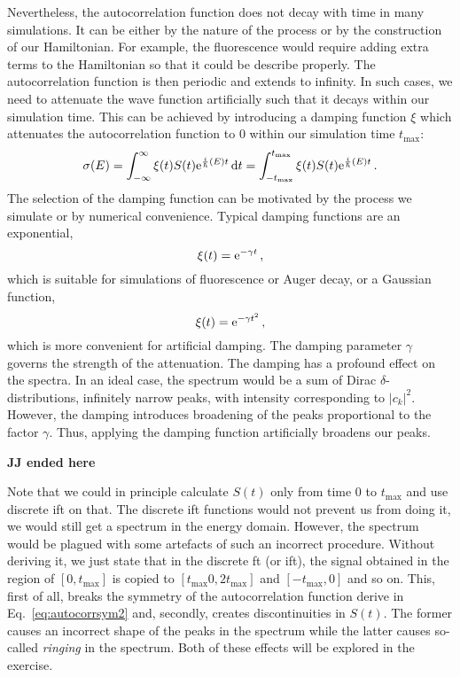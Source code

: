 Nevertheless, the autocorrelation function does not decay with time in many simulations. It can be either by the nature of the process or by the construction of our Hamiltonian. For example, the fluorescence would require adding extra terms to the Hamiltonian so that it could be describe properly. The autocorrelation function is then periodic and extends to infinity. In such cases, we need to attenuate the wave function artificially such that it decays within our simulation time. This can be achieved by introducing a damping function $\xi$ which attenuates the autocorrelation function to 0 within our simulation time $t_\mathrm{max}$:
\begin{equation}
    \sigma(E) = \int_{-\infty}^{\infty} \xi(t) S(t) \mathrm{e}^{\frac{i}{\hbar}(E)t}  \mathop{}\!\mathrm{d} t =  \int_{-t_\mathrm{max}}^{t_\mathrm{max}} \xi(t) S(t) \mathrm{e}^{\frac{i}{\hbar}(E)t}\, .
\end{equation}
The selection of the damping function can be motivated by the process we simulate or by numerical convenience.
Typical damping functions are an exponential, 
\begin{equation}
    \xi(t) = \mathrm{e}^{-\gamma t} \, ,
\end{equation}
which is suitable for simulations of fluorescence or Auger decay, or a  Gaussian function,
\begin{equation}
    \xi(t) = \mathrm{e}^{-\gamma t^2} \, ,
\end{equation}
which is more convenient for artificial damping. The damping parameter $\gamma$ governs the strength of the attenuation. The damping has a profound effect on the spectra. In an ideal case, the spectrum would be a sum of Dirac $\delta$-distributions, infinitely narrow peaks, with intensity corresponding to $|c_k|^2$. However, the damping introduces broadening of the peaks proportional to the factor $\gamma$. Thus, applying the damping function artificially broadens our peaks. 

\textbf{JJ ended here}



\hline
Note that we could in principle calculate $S(t)$ only from time 0 to $t_\mathrm{max}$ and use discrete \acrshort{ift} on that. The discrete \acrshort{ift} functions would not prevent us from doing it, we would still get a spectrum in the energy domain. However, the spectrum would be plagued with some artefacts of such an incorrect procedure. Without deriving it, we just state that in the discrete \acrshort{ft} (or \acrshort{ift}), the signal obtained in the region of $[0, t_\mathrm{max}]$ is copied to $[t_\mathrm{max}0, 2t_\mathrm{max}]$ and $[-t_\mathrm{max}, 0]$ and so on. This, first of all, breaks the symmetry of the autocorrelation function derive in Eq.~\eqref{eq:autocorrsym2} and, secondly, creates discontinuities in $S(t)$. The former causes an incorrect shape of the peaks in the spectrum while the latter causes so-called \textit{ringing} in the spectrum. Both of these effects will be explored in the exercise.

